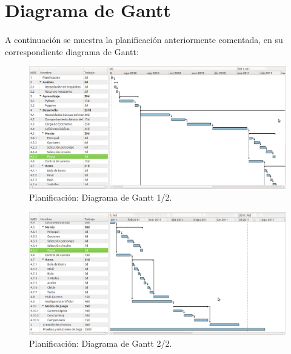 \section{Diagrama de Gantt}

\paragraph{}
A continuación se muestra la planificación anteriormente comentada, en su correspondiente diagrama de Gantt:

\begin{figure}[H]
  \label{gant1}
  \begin{center}
    \includegraphics[scale=0.30]{imagenes/planificacion/gant1.png}
  \end{center}
  \caption{Planificación: Diagrama de Gantt 1/2.}
\end{figure}

\begin{figure}[H]
  \label{gant2}
  \begin{center}
    \includegraphics[scale=0.30]{imagenes/planificacion/gant2.png}
  \end{center}
  \caption{Planificación: Diagrama de Gantt 2/2.}
\end{figure}

